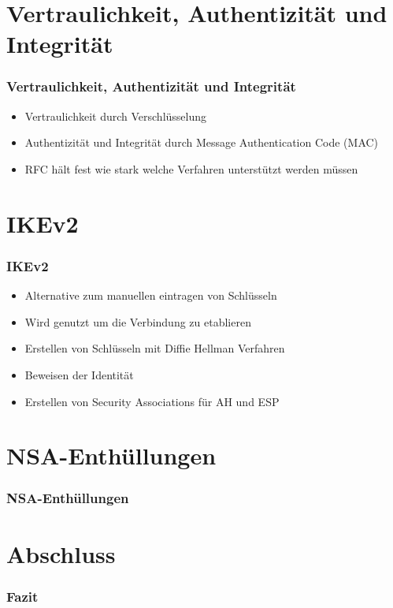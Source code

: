 \documentclass[t]{beamer}
\begin{document}
\section{Vertraulichkeit, Authentizität und Integrität}
\begin{frame}
	\frametitle{Vertraulichkeit, Authentizität und Integrität}
	\begin{itemize}
		\vfill
		\item Vertraulichkeit durch Verschlüsselung
		\vfill
		\item Authentizität und Integrität durch Message Authentication Code (MAC)
		\vfill
		\item RFC hält fest wie stark welche Verfahren unterstützt werden müssen
		\vfill
	\end{itemize}
\end{frame}

\section{IKEv2}
\begin{frame}
	\frametitle{IKEv2}
	\begin{itemize}
		\vfill
		\item Alternative zum manuellen eintragen von Schlüsseln
		\vfill
		\item Wird genutzt um die Verbindung zu etablieren
		\vfill
		\item Erstellen von Schlüsseln mit Diffie Hellman Verfahren
		\vfill
		\item Beweisen der Identität
		\vfill
		\item Erstellen von Security Associations für AH und ESP
		\vfill
	\end{itemize}
\end{frame}

\section{NSA-Enthüllungen}
\begin{frame}
	\frametitle{NSA-Enthüllungen}
\end{frame}

\section{Abschluss}
\begin{frame}
	\frametitle{Fazit}
\end{frame}
\end{document}
